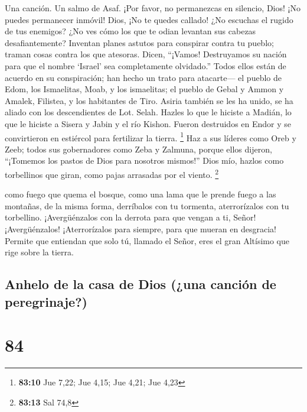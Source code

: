 Una canción. Un salmo de Asaf.  ¡Por favor, no permanezcas
en silencio, Dios! ¡No puedes permanecer inmóvil! Dios, ¡No te quedes
callado!  ¿No escuchas el rugido de tus enemigos? ¿No ves
cómo los que te odian levantan sus cabezas desafiantemente? 
Inventan planes astutos para conspirar contra tu pueblo; traman cosas
contra los que atesoras.  Dicen, ``¡Vamos! Destruyamos su
nación para que el nombre `Israel' sea completamente olvidado.''
 Todos ellos están de acuerdo en su conspiración; han hecho
un trato para atacarte---  el pueblo de Edom, los
Ismaelitas, Moab, y los ismaelitas;  el pueblo de Gebal y
Ammon y Amalek, Filistea, y los habitantes de Tiro.  Asiria
también se les ha unido, se ha aliado con los descendientes de Lot.
Selah.  Hazles lo que le hiciste a Madián, lo que le hiciste
a Sisera y Jabin y el río Kishon.  Fueron destruidos en
Endor y se convirtieron en estiércol para fertilizar la tierra.
\footnote{\textbf{83:10} Jue 7,22; Jue 4,15; Jue 4,21; Jue 4,23}
 Haz a sus líderes como Oreb y Zeeb; todos sus gobernadores
como Zeba y Zalmuna,  porque ellos dijeron, ``¡Tomemos los
pastos de Dios para nosotros mismos!''  Dios mío, hazlos
como torbellinos que giran, como pajas arrasadas por el viento.
\footnote{\textbf{83:13} Sal 74,8}

 como fuego que quema el bosque, como una lama que le
prende fuego a las montañas,  de la misma forma, derríbalos
con tu tormenta, aterrorízalos con tu torbellino. 
¡Avergüénzalos con la derrota para que vengan a ti, Señor! 
¡Avergüénzalos! ¡Aterrorízalos para siempre, para que mueran en
desgracia!  Permite que entiendan que solo tú, llamado el
Señor, eres el gran Altísimo que rige sobre la tierra.

\hypertarget{anhelo-de-la-casa-de-dios-una-canciuxf3n-de-peregrinaje}{%
\subsection{Anhelo de la casa de Dios (¿una canción de
peregrinaje?)}\label{anhelo-de-la-casa-de-dios-una-canciuxf3n-de-peregrinaje}}

\hypertarget{section-83}{%
\section{84}\label{section-83}}


